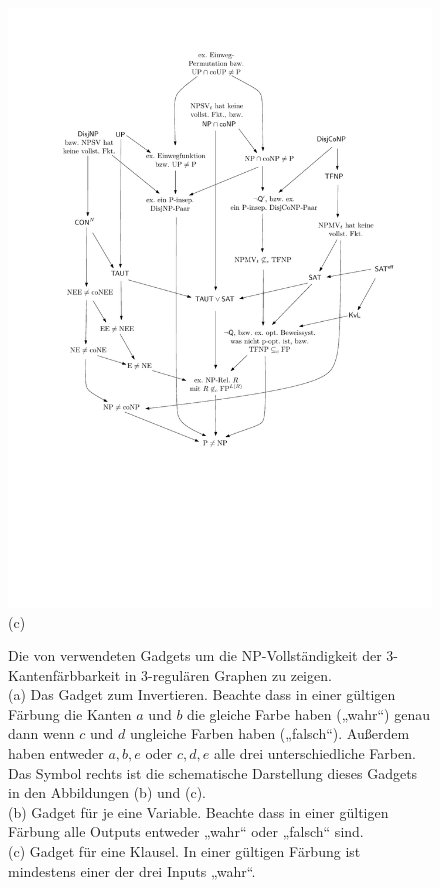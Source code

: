 \begin{figure}[t]
\begin{minipage}{.3\textwidth}
    \centering\includegraphics[page=5]{figures.pdf}\\\smallskip
    (c)
    \end{minipage}
    \caption{Die von \textcite{holyer_np-completeness_1981} verwendeten Gadgets um die NP-Vollständigkeit der 3-Kantenfärbbarkeit in 3-regulären Graphen zu zeigen.\\
        (a) Das Gadget zum Invertieren. Beachte dass in einer gültigen Färbung die Kanten $a$ und $b$ die gleiche Farbe haben („wahr“) genau dann wenn $c$ und $d$ ungleiche Farben haben („falsch“). Außerdem haben entweder $a,b,e$ oder $c,d,e$ alle drei unterschiedliche Farben. Das Symbol rechts ist die schematische Darstellung dieses Gadgets in den Abbildungen (b) und (c).\\
        (b) Gadget für je eine Variable. Beachte dass in einer gültigen Färbung alle Outputs entweder „wahr“ oder „falsch“ sind.\\
        (c) Gadget für eine Klausel. In einer gültigen Färbung ist mindestens einer der drei Inputs „wahr“.
    }\label{fig:chromindex}
\end{figure}


